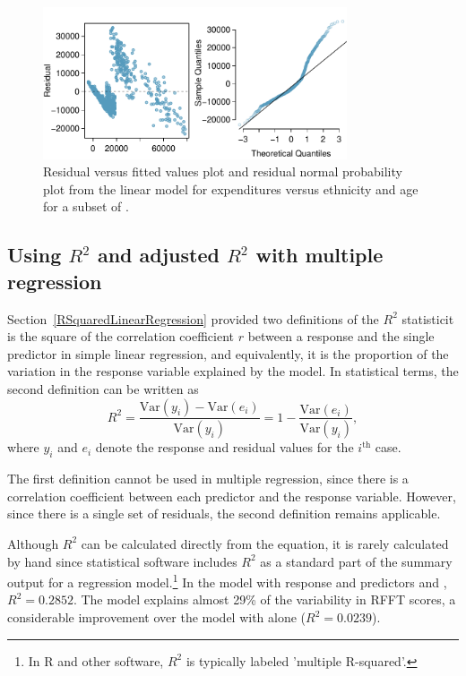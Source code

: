 \begin{figure}[h]
	\centering
	\includegraphics[width=0.8\textwidth]
	{ch_multiple_linear_regression_oi_biostat/figures/ddsAgeEthnicityResidNormPlot/ddsAgeEthnicityResidNormPlot.pdf}
	\caption{Residual versus fitted values plot and residual normal probability plot from the linear model for expenditures versus ethnicity and age for a subset of .}
	\label{ddsAgeEthnicityResidNormPlot}
\end{figure}



\textD{\newpage}


\subsection{Using $R^2$ and adjusted $R^2$ with multiple regression}

Section~\ref{RSquaredLinearRegression} provided two definitions of the $R^2$ statistic\textemdash it is the square of the correlation coefficient $r$ between a response and the single predictor in simple linear regression, and equivalently, it is the proportion of the variation in the response variable explained by the model.  In statistical terms, the second definition can be written as 
\[
   R^2 = \frac{\text{Var}(y_i) - \text{Var}(e_i)}
   {\text{Var}(y_i)} = 1 - \frac{\text{Var}(e_i)}{\text{Var}(y_i)},
   \label{RSquareDefinition}\]
where $y_i$ and $e_i$ denote the response and residual values for the
$i^{\text{th}}$ case.

The first definition cannot be used in multiple regression, since there is a correlation coefficient between each predictor and the response variable. However, since there is a single set of residuals, the second definition remains applicable. 

Although $R^2$ can be calculated directly from the equation, it is rarely calculated by hand since statistical software includes $R^2$ as a standard part of the summary output for a regression model.\footnote{In \textsf{R} and other software, $R^2$ is typically labeled 'multiple R-squared'.} In the model with response  and predictors  and , $R^2 = 0.2852$.  The model explains almost 29\% of the variability in RFFT scores, a considerable improvement over the model with  alone ($R^2 = 0.0239$).

